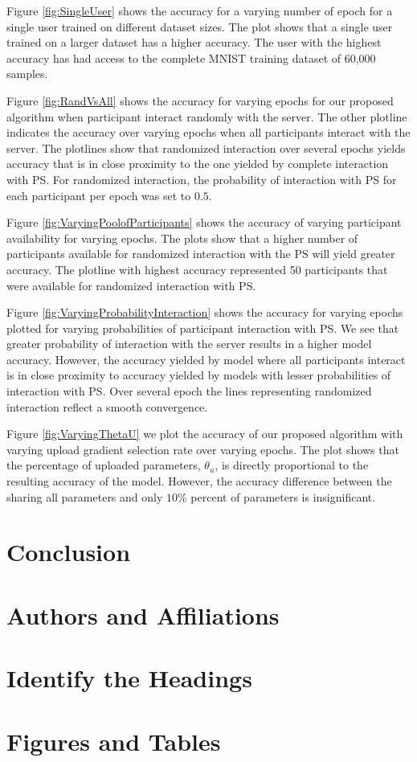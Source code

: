 \documentclass[conference]{IEEEtran}
\begin{document}
Figure \ref{fig:SingleUser} shows the accuracy for a varying number of epoch for a single user trained on different dataset sizes. The plot shows that a single user trained on a larger dataset has a higher accuracy. The user with the highest accuracy has had access to the complete MNIST training dataset of 60,000 samples. 

Figure \ref{fig:RandVsAll} shows the accuracy for varying epochs for our proposed algorithm when participant interact randomly with the server. The other plotline indicates the accuracy over varying epochs when all participants interact with the server. The plotlines show that randomized interaction over several epochs yields accuracy that is in close proximity to the one yielded by complete interaction with PS. For randomized interaction, the probability of interaction with PS for each participant per epoch was set to $0.5$.

Figure \ref{fig:VaryingPoolofParticipants} shows the accuracy of varying participant availability for varying epochs. The plots show that a higher number of participants available for randomized interaction with the PS will yield greater accuracy. The plotline with highest accuracy represented 50 participants that were available for randomized interaction with PS.

Figure \ref{fig:VaryingProbabilityInteraction} shows the accuracy for varying epochs plotted for varying probabilities of participant interaction with PS. We see that greater probability of interaction with the server results in a higher model accuracy. However, the accuracy yielded by model where all participants interact is in close proximity to accuracy yielded by models with lesser probabilities of interaction with PS. Over several epoch the lines representing randomized interaction reflect a smooth convergence.

Figure \ref{fig:VaryingThetaU} we plot the accuracy of our proposed algorithm with varying upload gradient selection rate over varying epochs. The plot shows that the percentage of uploaded parameters, $\theta_u$, is directly proportional to the resulting accuracy of the model. However, the accuracy difference between the sharing all parameters and only $ 10\% $ percent of parameters is insignificant.





\section{Conclusion}


\section{Authors and Affiliations}


\section{Identify the Headings}


\section{Figures and Tables}





\end{document}
